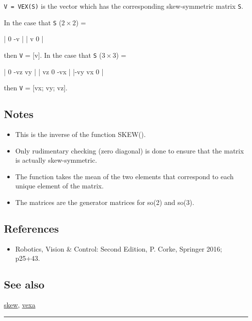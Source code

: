 \texttt{V = VEX(S)} is the vector which has the corresponding skew-symmetric
matrix \texttt{S}.



In the case that \texttt{S} ($2 \times 2$) =

\begin{Code}
     | 0  -v |
     | v   0 |

\end{Code}


then \texttt{V} = [v].  In the case that \texttt{S} ($3 \times 3$) =

\begin{Code}
     |  0  -vz   vy |
     | vz    0  -vx |
     |-vy   vx    0 |

\end{Code}


then \texttt{V} = [vx; vy; vz].


\subsection*{Notes}
\begin{itemize}
  \item This is the inverse of the function SKEW().
  \item Only rudimentary checking (zero diagonal) is done to ensure that the    matrix is actually skew-symmetric.
  \item The function takes the mean of the two elements that correspond to    each unique element of the matrix.
  \item The matrices are the generator matrices for so(2) and so(3).
\end{itemize}

\subsection*{References}
\begin{itemize}
  \item Robotics, Vision \& Control: Second Edition, P. Corke, Springer 2016; p25+43.
\end{itemize}

\subsection*{See also}


\hyperlink{skew}{\color{blue} skew}, \hyperlink{vexa}{\color{blue} vexa}

\vspace{1.5ex}\rule{\textwidth}{1mm}

